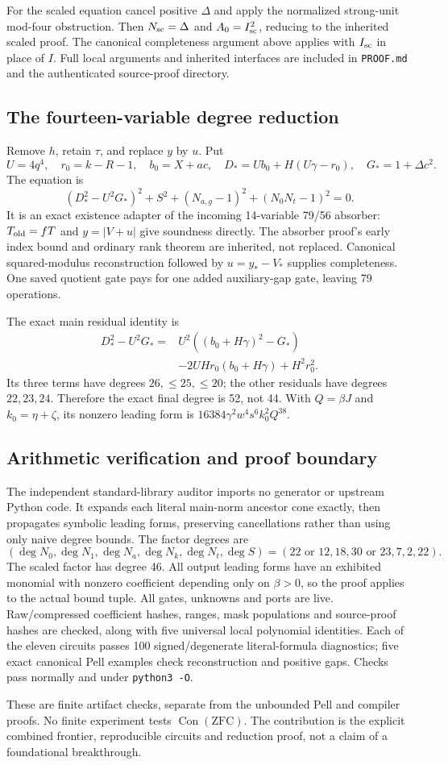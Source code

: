 For the scaled equation cancel positive $\Delta$ and apply the normalized
strong-unit mod-four obstruction. Then $N_{\rm sc}=\Delta$ and
$A_0=I_{\rm sc}^2$, reducing to the inherited scaled proof. The canonical
completeness argument above applies with $I_{\rm sc}$ in place of $I$.
Full local arguments and inherited interfaces are included in
\texttt{PROOF.md} and the authenticated source-proof directory.

\subsection{The fourteen-variable degree reduction}
Remove $h$, retain $\tau$, and replace $y$ by $u$. Put
\[
 U=4q^4,\quad r_0=k-R-1,\quad b_0=X+ac,\quad
 D_*=Ub_0+H(U\gamma-r_0),\quad G_*=1+\Delta c^2.
\]
The equation is
\[
 (D_*^2-U^2G_*)^2+S^2+(N_{a,g}-1)^2+(N_0N_t-1)^2=0.
\]
It is an exact existence adapter of the incoming 14-variable 79/56
absorber: $T_{\rm old}=fT$ and $y=|V+u|$ give soundness directly.
The absorber proof's early index bound and ordinary rank theorem are
inherited, not replaced. Canonical squared-modulus reconstruction followed
by $u=y_*-V_*$ supplies completeness. One saved quotient gate pays for
one added auxiliary-gap gate, leaving 79 operations.

The exact main residual identity is
\begin{align*}
 D_*^2-U^2G_*={}&U^2((b_0+H\gamma)^2-G_*)\\
 &-2UH r_0(b_0+H\gamma)+H^2r_0^2.
\end{align*}
Its three terms have degrees $26,\le25,\le20$; the other residuals have
degrees $22,23,24$. Therefore the exact final degree is 52, not 44.
With $Q=\beta J$ and $k_0=\eta+\zeta$, its nonzero leading form is
$16384\gamma^2w^4s^6k_0^2Q^{38}$.

\subsection{Arithmetic verification and proof boundary}
The independent standard-library auditor imports no generator or upstream
Python code. It expands each literal main-norm ancestor cone exactly,
then propagates symbolic leading forms, preserving cancellations rather
than using only naive degree bounds. The factor degrees are
\[
 (\deg N_0,\deg N_1,\deg N_a,\deg N_k,\deg N_t,\deg S)
 =(22\text{ or }12,18,30\text{ or }23,7,2,22).
\]
The scaled factor has degree 46. All output leading forms have an exhibited
monomial with nonzero coefficient depending only on $\beta>0$, so the
proof applies to the actual bound tuple. All gates, unknowns and ports
are live. Raw/compressed coefficient hashes, ranges, mask populations and
source-proof hashes are checked, along with five universal local polynomial identities. Each of the eleven circuits passes 100
signed/degenerate literal-formula diagnostics; five exact canonical Pell
examples check reconstruction and positive gaps. Checks pass normally and
under \texttt{python3 -O}.

These are finite artifact checks, separate from the unbounded Pell and
compiler proofs. No finite experiment tests $\operatorname{Con}(\mathrm{ZFC})$.
The contribution is the explicit combined frontier, reproducible circuits
and reduction proof, not a claim of a foundational breakthrough.
